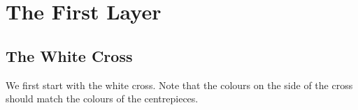 \documentclass{article}
\begin{document}
    \section{The First Layer}

    \begin{minipage}{0.6\textwidth}
        \subsection{The White Cross}
        We first start with the white cross.
        Note that the colours on the side of the cross should match the colours of the centrepieces.
    \end{minipage}%
    \hfill%
    \RubikCubeGreyWY
\end{document}
